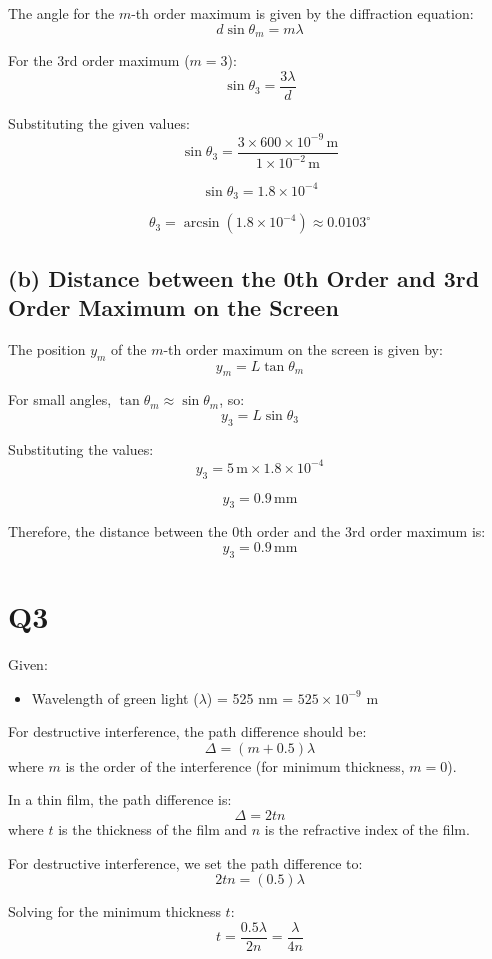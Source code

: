 \documentclass{article}
\begin{document}
The angle for the \(m\)-th order maximum is given by the diffraction equation:
\[
d \sin \theta_m = m \lambda
\]

For the 3rd order maximum (\(m = 3\)):
\[
\sin \theta_3 = \frac{3 \lambda}{d}
\]

Substituting the given values:
\[
\sin \theta_3 = \frac{3 \times 600 \times 10^{-9} \, \text{m}}{1 \times 10^{-2} \, \text{m}}
\]

\[
\sin \theta_3 = 1.8 \times 10^{-4}
\]

\[
\theta_3 = \arcsin(1.8 \times 10^{-4}) \approx 0.0103^\circ
\]

\subsection*{(b) Distance between the 0th Order and 3rd Order Maximum on the Screen}

The position \(y_m\) of the \(m\)-th order maximum on the screen is given by:
\[
y_m = L \tan \theta_m
\]

For small angles, \(\tan \theta_m \approx \sin \theta_m\), so:
\[
y_3 = L \sin \theta_3
\]

Substituting the values:
\[
y_3 = 5 \, \text{m} \times 1.8 \times 10^{-4}
\]

\[
y_3 = 0.9 \, \text{mm}
\]

Therefore, the distance between the 0th order and the 3rd order maximum is:
\[
y_3 = 0.9 \, \text{mm}
\]


\section*{Q3}

Given:
\begin{itemize}
    \item Wavelength of green light ($\lambda$) = 525 nm = \(525 \times 10^{-9}\) m
\end{itemize}

For destructive interference, the path difference should be:
\[
\Delta = (m + 0.5) \lambda
\]
where \(m\) is the order of the interference (for minimum thickness, \(m = 0\)).

In a thin film, the path difference is:
\[
\Delta = 2 t n
\]
where \(t\) is the thickness of the film and \(n\) is the refractive index of the film.

For destructive interference, we set the path difference to:
\[
2 t n = (0.5) \lambda
\]

Solving for the minimum thickness \(t\):
\[
t = \frac{0.5 \lambda}{2 n} = \frac{\lambda}{4 n}
\]
\end{document}
